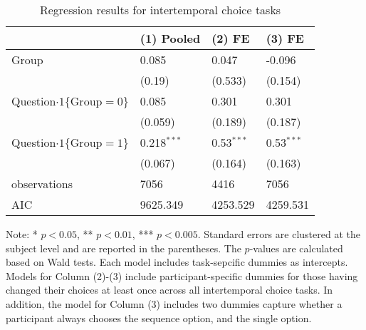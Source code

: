 \documentclass[12pt]{article}
\begin{document}
\begin{table}
    \caption{Regression results for intertemporal choice tasks}
    \vspace*{12pt}
    \centering

      \begin{tabular}{llll}
\hline
 & (1) Pooled & (2) FE & (3) FE \\
\hline
Group & 0.085 & 0.047 & -0.096 \\
 & (0.19) & (0.533) & (0.154) \\
Question$\cdot1\{\text{Group}=0\}$ & 0.085 & 0.301 & 0.301 \\
 & (0.059) & (0.189) & (0.187) \\
Question$\cdot1\{\text{Group}=1\}$ & 0.218$^{***}$ & 0.53$^{***}$ & 0.53$^{***}$ \\
 & (0.067) & (0.164) & (0.163) \\\hline

observations & 7056 & 4416 & 7056 \\
AIC & 9625.349 & 4253.529 & 4259.531 \\
\hline
\end{tabular}

    \vspace*{4pt}
    \centering
    \begin{minipage}{0.85\textwidth}
    {\par\footnotesize Note: * $p<0.05$, ** $p<0.01$, *** $p<0.005$. Standard errors are clustered at the subject level and are reported in the parentheses. The $p$-values are calculated based on Wald tests. Each model includes task-sepcific dummies as intercepts. Models for Column (2)-(3) include participant-specific dummies for those having changed their choices at least once across all intertemporal choice tasks. In addition, the model for Column (3) includes two dummies capture whether a participant always chooses the sequence option, and the single option. }
    \end{minipage}
    \label{tab:exp3_reg_intertemporal_choice}
\end{table}
\end{document}
